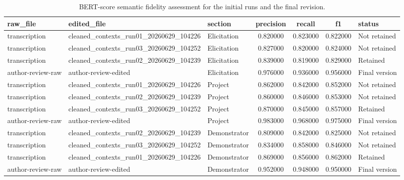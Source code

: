 \begin{table}
\caption{BERT-score semantic fidelity assessment for the initial runs and the final revision.}
\label{tab:text_cleaning_semantic_fidelity}
\begin{tabular}{ll l c c c l}
\toprule
raw_file & edited_file & section & precision & recall & f1 & status \\
\midrule
transcription & cleaned_contexts_run01_20260629_104226 & Elicitation & 0.820000 & 0.823000 & 0.822000 & Not retained \\
transcription & cleaned_contexts_run03_20260629_104252 & Elicitation & 0.827000 & 0.820000 & 0.824000 & Not retained \\
transcription & cleaned_contexts_run02_20260629_104239 & Elicitation & 0.839000 & 0.819000 & 0.829000 & Retained \\
author-review-raw & author-review-edited & Elicitation & 0.976000 & 0.936000 & 0.956000 & Final version \\
transcription & cleaned_contexts_run01_20260629_104226 & Project & 0.862000 & 0.842000 & 0.852000 & Not retained \\
transcription & cleaned_contexts_run02_20260629_104239 & Project & 0.860000 & 0.846000 & 0.853000 & Not retained \\
transcription & cleaned_contexts_run03_20260629_104252 & Project & 0.870000 & 0.845000 & 0.857000 & Retained \\
author-review-raw & author-review-edited & Project & 0.983000 & 0.968000 & 0.975000 & Final version \\
transcription & cleaned_contexts_run02_20260629_104239 & Demonstrator & 0.809000 & 0.842000 & 0.825000 & Not retained \\
transcription & cleaned_contexts_run03_20260629_104252 & Demonstrator & 0.834000 & 0.858000 & 0.846000 & Not retained \\
transcription & cleaned_contexts_run01_20260629_104226 & Demonstrator & 0.869000 & 0.856000 & 0.862000 & Retained \\
author-review-raw & author-review-edited & Demonstrator & 0.952000 & 0.948000 & 0.950000 & Final version \\
\bottomrule
\end{tabular}
\end{table}
